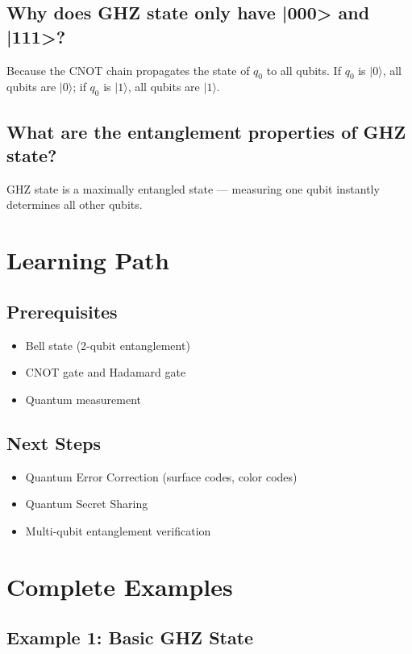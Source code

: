 \documentclass[12pt,a4paper]{article}
\begin{document}
\subsection{Why does GHZ state only have |000> and |111>?}

Because the CNOT chain propagates the state of $q_0$ to all qubits. If $q_0$ is $|0\rangle$, all qubits are $|0\rangle$; if $q_0$ is $|1\rangle$, all qubits are $|1\rangle$.

\subsection{What are the entanglement properties of GHZ state?}

GHZ state is a maximally entangled state — measuring one qubit instantly determines all other qubits.

\section{Learning Path}

\subsection{Prerequisites}
\begin{itemize}
  \item Bell state (2-qubit entanglement)
  \item CNOT gate and Hadamard gate
  \item Quantum measurement
\end{itemize}

\subsection{Next Steps}
\begin{itemize}
  \item Quantum Error Correction (surface codes, color codes)
  \item Quantum Secret Sharing
  \item Multi-qubit entanglement verification
\end{itemize}

\section{Complete Examples}

\subsection{Example 1: Basic GHZ State}
\end{document}
